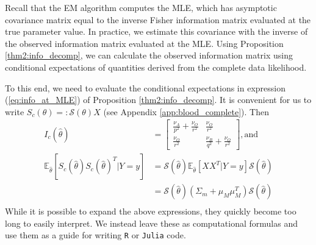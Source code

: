 \documentclass[11pt, oneside]{article}   	%
\newcommand{\bE}{\mathbb{E}}
\begin{document}
\begin{appendices}
    Recall that the EM algorithm computes the MLE, which has asymptotic covariance matrix equal to the inverse Fisher information matrix evaluated at the true parameter value. In practice, we estimate this covariance with the inverse of the observed information matrix evaluated at the MLE. Using Proposition \ref{thm2:info_decomp}, we can calculate the observed information matrix using conditional expectations of quantities derived from the complete data likelihood. 
    
    To this end, we need to evaluate the conditional expectations in expression (\ref{eq:info_at_MLE}) of Proposition \ref{thm2:info_decomp}. It is convenient for us to write $S_c(\theta) =: \mathscr{S}(\theta) X$ (see Appendix \ref{app:blood_complete}). Then 
    \begin{align}
        I_c(\hat{\theta}) &= \begin{bmatrix}
            \frac{\nu_A}{p^2} + \frac{\nu_O}{r^2} & \frac{\nu_O}{r^2}\\
            \frac{\nu_O}{r^2} & \frac{\nu_B}{q^2} + \frac{\nu_O}{r^2}
        \end{bmatrix} \mathrm{, and}\\
        \bE_{\hat{\theta}} [ S_c(\hat{\theta}) S_c(\hat{\theta})^T | Y=y] &= \mathscr{S}(\hat{\theta}) \bE_{\hat{\theta}} \left[ X X^T | Y=y \right] \mathscr{S}(\hat{\theta}) \\
        &= \mathscr{S}(\hat{\theta}) (\Sigma_m + \mu_M \mu_M^T) \mathscr{S}(\hat{\theta})\\
    \end{align}
    While it is possible to expand the above expressions, they quickly become too long to easily interpret. We instead leave these as computational formulas and use them as a guide for writing \texttt{R} or \texttt{Julia} code.

\end{appendices}

\newpage


% 


\end{document}
